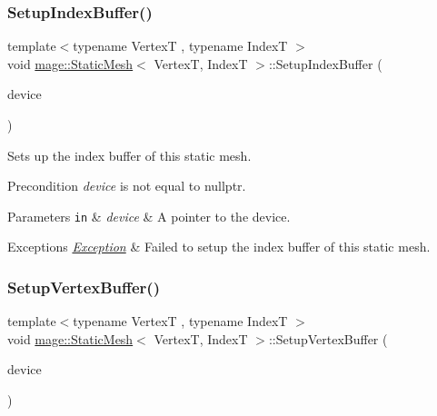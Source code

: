 \subsubsection{\texorpdfstring{Setup\+Index\+Buffer()}{SetupIndexBuffer()}}
{\footnotesize\ttfamily template$<$typename VertexT , typename IndexT $>$ \\
void \hyperlink{classmage_1_1_static_mesh}{mage\+::\+Static\+Mesh}$<$ VertexT, IndexT $>$\+::Setup\+Index\+Buffer (\begin{DoxyParamCaption}\item[{I\+D3\+D11\+Device5 $\ast$}]{device }\end{DoxyParamCaption})\hspace{0.3cm}{\ttfamily [private]}}

Sets up the index buffer of this static mesh.

\begin{DoxyPrecond}{Precondition}
{\itshape device} is not equal to {\ttfamily nullptr}. 
\end{DoxyPrecond}

\begin{DoxyParams}[1]{Parameters}
\mbox{\tt in}  & {\em device} & A pointer to the device. \\
\hline
\end{DoxyParams}

\begin{DoxyExceptions}{Exceptions}
{\em \hyperlink{classmage_1_1_exception}{Exception}} & Failed to setup the index buffer of this static mesh. \\
\hline
\end{DoxyExceptions}
\hypertarget{classmage_1_1_static_mesh_a5e9c8e2a9441ccb41b52938cf05c4034}{}\label{classmage_1_1_static_mesh_a5e9c8e2a9441ccb41b52938cf05c4034} 
\subsubsection{\texorpdfstring{Setup\+Vertex\+Buffer()}{SetupVertexBuffer()}}
{\footnotesize\ttfamily template$<$typename VertexT , typename IndexT $>$ \\
void \hyperlink{classmage_1_1_static_mesh}{mage\+::\+Static\+Mesh}$<$ VertexT, IndexT $>$\+::Setup\+Vertex\+Buffer (\begin{DoxyParamCaption}\item[{I\+D3\+D11\+Device5 $\ast$}]{device }\end{DoxyParamCaption})\hspace{0.3cm}{\ttfamily [private]}}

